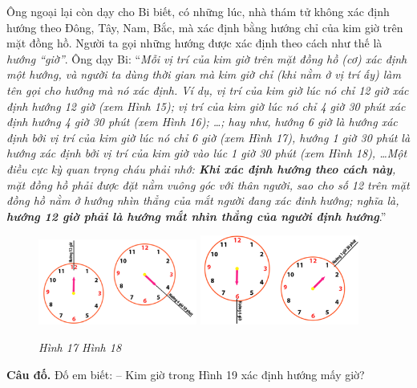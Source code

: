 	Ông ngoại lại còn dạy cho Bi biết, có những lúc, nhà thám tử không xác định hướng theo Đông, Tây, Nam, Bắc, mà xác định bằng hướng chỉ của kim giờ trên mặt đồng hồ. Người ta gọi những hướng được xác định theo cách như thế là \textit{hướng “giờ”}. Ông dạy Bi:
	\vskip 0.1cm
	“\textit{Mỗi vị trí của kim giờ trên mặt đồng hồ (cơ) xác định một hướng, và người ta dùng thời gian mà kim giờ chỉ (khi nằm ở vị trí ấy) làm tên gọi cho hướng mà nó xác định. Ví dụ, vị trí của kim giờ lúc nó chỉ 12 giờ xác định hướng 12 giờ (xem Hình 15); vị trí của kim giờ lúc nó chỉ 4 giờ 30 phút xác định hướng 4 giờ 30 phút (xem Hình 16); \ldots; hay như, hướng 6 giờ là hướng xác định bởi vị trí của kim giờ lúc nó chỉ 6 giờ (xem Hình 17), hướng 1 giờ 30 phút là hướng xác định bởi vị trí của kim giờ vào lúc 1 giờ 30 phút (xem Hình 18), \ldots Một điều cực kỳ quan trọng cháu phải nhớ: \textbf{Khi xác định hướng theo cách này}, mặt đồng hồ phải được đặt nằm vuông góc với thân người, sao cho số 12 trên mặt đồng hồ nằm ở hướng nhìn thẳng của mắt người đang xác đinh hướng; nghĩa là, \textbf{hướng 12 giờ phải là hướng mắt nhìn thẳng của người định hướng}}.”
		\begin{figure}[H]
		\centering
		\vspace*{4pt}
		\captionsetup{labelformat= empty, justification=centering}
		\includegraphics[width=0.465\textwidth]{pic15}
		\includegraphics[width=0.465\textwidth]{pic16}
		\caption{\small\textit{Hình 17 \hspace*{70pt} Hình 18}}
		\vspace*{-10pt}
	\end{figure}
	\textbf{Câu đố.} Đố em biết:
	\vskip 0.05cm
	-- Kim giờ trong Hình 19 xác định hướng  mấy giờ?
